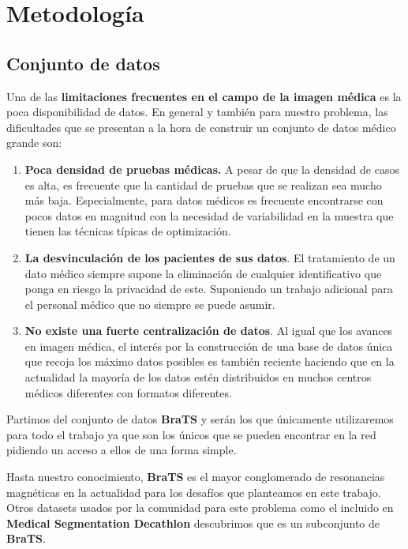 \section{Metodología}

\subsection{Conjunto de datos}

Una de las \textbf{limitaciones frecuentes en el campo de la imagen médica} es la poca disponibilidad de datos. En general y también para nuestro problema, las dificultades que se presentan a la hora de construir un conjunto de datos médico grande son:

\begin{enumerate}
	\item \textbf{Poca densidad de pruebas médicas.} A pesar de que la densidad de casos es alta, es frecuente que la cantidad de pruebas que se realizan sea mucho más baja. Especialmente, para datos médicos es frecuente encontrarse con pocos datos en magnitud con la necesidad de variabilidad en la muestra que tienen las técnicas típicas de optimización.
	
	\item \textbf{La desvinculación de los pacientes de sus datos}. El tratamiento de un dato médico siempre supone la eliminación de cualquier identificativo que ponga en riesgo la privacidad de este. Suponiendo un trabajo adicional para el personal médico que no siempre se puede asumir.
	
	\item \textbf{No existe una fuerte centralización de datos}. Al igual que los avances en imagen médica, el interés por la construcción de una base de datos única que recoja los máximo datos posibles es también reciente haciendo que en la actualidad la mayoría de los datos estén distribuidos en muchos centros médicos diferentes con formatos diferentes.
	
\end{enumerate}

Partimos del conjunto de datos \textbf{BraTS} y serán los que únicamente utilizaremos para todo el trabajo ya que son los únicos que se pueden encontrar en la red pidiendo un acceso a ellos de una forma simple.

Hasta nuestro conocimiento, \textbf{BraTS} es el mayor conglomerado de resonancias magnéticas en la actualidad para los desafíos que planteamos en este trabajo. Otros datasets usados por la comunidad para este problema como el incluido en \textbf{Medical Segmentation Decathlon} descubrimos que es un subconjunto de \textbf{BraTS}.


